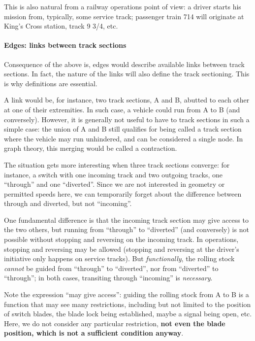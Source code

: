 \documentclass[
  11pt,
]{article}
\begin{document}
This is also natural from a railway operations point of view: a driver
starts his mission from, typically, some service track; passenger train
714 will originate at King's Cross station, track 9 3/4, etc.

\hypertarget{edges-links-between-track-sections}{%
\paragraph{Edges: links between track
sections}\label{edges-links-between-track-sections}}

Consequence of the above is, edges would describe available links
between track sections. In fact, the nature of the links will also
define the track sectioning. This is why definitions are essential.

A link would be, for instance, two track sections, A and B, abutted to
each other at one of their extremities. In such case, a vehicle could
run from A to B (and conversely). However, it is generally not useful to
have to track sections in such a simple case: the union of A and B still
qualifies for being called a track section where the vehicle may run
unhindered, and can be considered a single node. In graph theory, this
merging would be called a contraction.

The situation gets more interesting when three track sections converge:
for instance, a switch with one incoming track and two outgoing tracks,
one ``through'' and one ``diverted''. Since we are not interested in
geometry or permitted speeds here, we can temporarily forget about the
difference between through and diverted, but not ``incoming''.

One fundamental difference is that the incoming track section may give
access to the two others, but running from ``through'' to ``diverted''
(and conversely) is not possible without stopping and reversing on the
incoming track. In operations, stopping and reversing may be allowed
(stopping and reversing at the driver's initiative only happens on
service tracks). But \emph{functionally}, the rolling stock
\emph{cannot} be guided from ``through'' to ``diverted'', nor from
``diverted'' to ``through''; in both cases, transiting through
``incoming'' is \emph{necessary}.

Note the expression ``may give access'': guiding the rolling stock from
A to B is a function that may see many restrictions, including but not
limited to the position of switch blades, the blade lock being
established, maybe a signal being open, etc. Here, we do not consider
any particular restriction, \textbf{not even the blade position, which
is not a sufficient condition anyway}.
\end{document}
